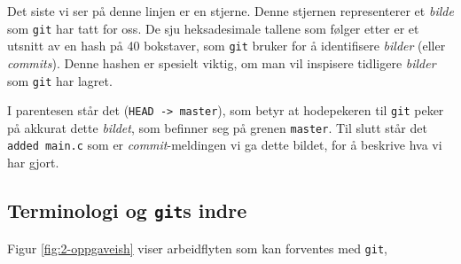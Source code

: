 \begin{alphasection}
Det siste vi ser på denne linjen er en stjerne. Denne stjernen representerer et \textit{bilde} som \verb|git| har tatt for oss. De sju heksadesimale tallene som følger etter er et utsnitt av en hash på 40 bokstaver, som \verb|git| bruker for å identifisere \textit{bilder} (eller \textit{commits}). Denne hashen er spesielt viktig, om man vil inspisere tidligere \textit{bilder} som \verb|git| har lagret.

I parentesen står det (\verb|HEAD -> master|), som betyr at hodepekeren til \verb|git| peker på akkurat dette \textit{bildet}, som befinner seg på grenen \verb|master|. Til slutt står det \verb|added main.c| som er \textit{commit}-meldingen vi ga dette bildet, for å beskrive hva vi har gjort.


\subsection{Terminologi og \texttt{git}s indre}
Figur \ref{fig:2-oppgaveish} viser arbeidflyten som kan forventes med \verb|git|,


\begin{figure}[ht]
    \centering
    


\end{figure}
\end{alphasection}
